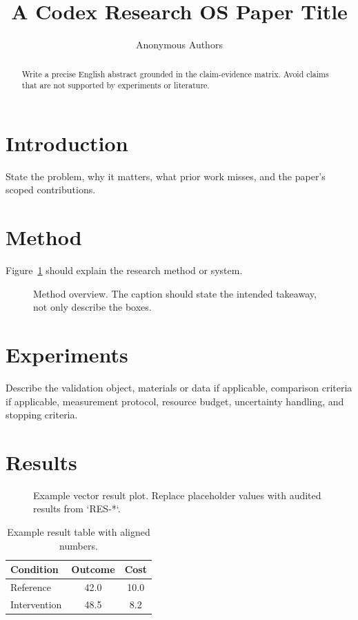 \documentclass[10pt]{article}
\title{A Codex Research OS Paper Title}
\author{Anonymous Authors}
\date{}
\begin{document}
\maketitle

\begin{abstract}
Write a precise English abstract grounded in the claim-evidence matrix. Avoid claims that are not supported by experiments or literature.
\end{abstract}

\section{Introduction}

State the problem, why it matters, what prior work misses, and the paper's scoped contributions.

\section{Method}

Figure~\ref{fig:method} should explain the research method or system.

\begin{figure}[t]
  \centering
  
  \caption{Method overview. The caption should state the intended takeaway, not only describe the boxes.}
  \label{fig:method}
\end{figure}

\section{Experiments}

Describe the validation object, materials or data if applicable, comparison criteria if applicable, measurement protocol, resource budget, uncertainty handling, and stopping criteria.

\section{Results}

\begin{figure}[t]
  \centering
  
  \caption{Example vector result plot. Replace placeholder values with audited results from `RES-*`.}
  \label{fig:results}
\end{figure}

\begin{table}[t]
  \centering
  \caption{Example result table with aligned numbers.}
  \label{tab:main}
  \begin{tabular}{lS[table-format=2.1]S[table-format=2.1]}
    \toprule
    {Condition} & {Outcome} & {Cost} \\
    \midrule
    Reference & 42.0 & 10.0 \\
    Intervention & 48.5 & 8.2 \\
    \bottomrule
  \end{tabular}
\end{table}
\end{document}

